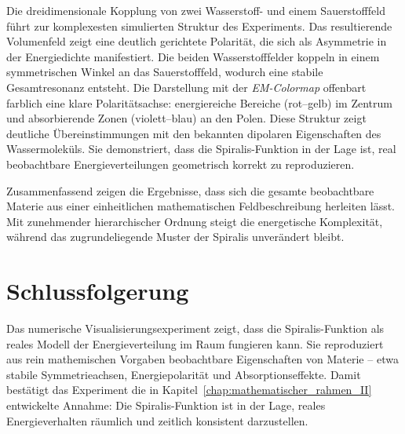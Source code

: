 Die dreidimensionale Kopplung von zwei Wasserstoff- und einem Sauerstofffeld führt zur komplexesten simulierten Struktur des Experiments.
Das resultierende Volumenfeld zeigt eine deutlich gerichtete Polarität, die sich als Asymmetrie in der Energiedichte manifestiert. 
Die beiden Wasserstofffelder koppeln in einem symmetrischen Winkel an das Sauerstofffeld, wodurch eine stabile Gesamtresonanz entsteht. 
Die Darstellung mit der \textit{EM-Colormap} offenbart farblich eine klare Polaritätsachse: energiereiche Bereiche (rot–gelb) im Zentrum und absorbierende Zonen (violett–blau) an den Polen.
Diese Struktur zeigt deutliche Übereinstimmungen mit den bekannten dipolaren Eigenschaften des Wassermoleküls. 
Sie demonstriert, dass die Spiralis-Funktion in der Lage ist, real beobachtbare Energieverteilungen geometrisch korrekt zu reproduzieren.

\vspace{0.5em}
\noindent 
Zusammenfassend zeigen die Ergebnisse, dass sich die gesamte beobachtbare Materie aus einer einheitlichen mathematischen Feldbeschreibung herleiten lässt. 
Mit zunehmender hierarchischer Ordnung steigt die energetische Komplexität, während das zugrundeliegende Muster der Spiralis unverändert bleibt.



\section{Schlussfolgerung}

Das numerische Visualisierungsexperiment zeigt,
dass die Spiralis-Funktion als reales Modell der Energieverteilung
im Raum fungieren kann.
Sie reproduziert aus rein mathemischen Vorgaben
beobachtbare Eigenschaften von Materie – etwa
stabile Symmetrieachsen, Energiepolarität und Absorptionseffekte.
Damit bestätigt das Experiment die in Kapitel~\ref{chap:mathematischer_rahmen_II}
entwickelte Annahme:
Die Spiralis-Funktion ist in der Lage, reales Energieverhalten
räumlich und zeitlich konsistent darzustellen.
